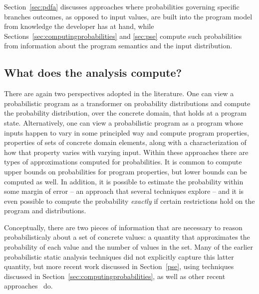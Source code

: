 Section~\ref{sec:pdfa} discusses approaches where probabilities
governing specific branches outcomes, as opposed to input values,
are built into the program model from knowledge the developer
has at hand, while Sections~\ref{sec:computingprobabilities}
and \ref{sec:pse} compute such probabilities from information about
the program semantics and the input distribution.

\subsection{What does the analysis compute?}
There are again two perspectives adopted in the literature.
One can view a probabilistic program as a transformer on probability
distributions and compute the probability distribution, over the
concrete domain, that holds at a program state.
Alternatively, one can view a probabilistic program as a program 
whose inputs happen
to vary in some principled way and compute program properties, 
properties of sets of concrete domain elements, along with a characterization
of how that property varies with varying input.
Within these approaches there are types of approximations
computed for probabilities.  It is common to compute upper bounds
on probabilities for program properties, but lower bounds can 
be computed as well.  In addition, it is possible to estimate the
probability within some margin of error -- an approach that several
techniques explore -- and it is even possible to compute the probability
\textit{exactly} if certain restrictions hold on the program and distributions.

Conceptually, there are two pieces of information that are necessary
to reason probabilisticaly about a set of concrete values: a quantity
that approximates the probability of each value and the number of
values in the set.  Many of the earlier probabilistic static analysis
techniques did not explicitly capture this latter quantity, but
more recent work discussed in Section~\ref{pse}, using
techniques discussed in Section~\ref{sec:computingprobabilities}, 
as well as other recent approaches~\cite{probablisticPolyhedra} do.



